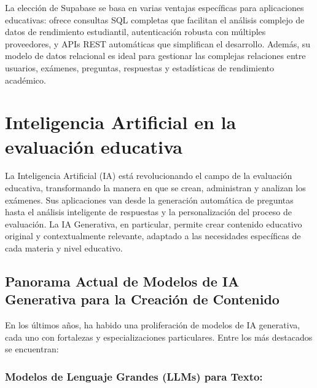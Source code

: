 \documentclass[12pt,a4paper]{report}
\begin{document}
La elección de Supabase se basa en varias ventajas específicas para aplicaciones educativas: ofrece consultas SQL completas que facilitan el análisis complejo de datos de rendimiento estudiantil, autenticación robusta con múltiples proveedores, y APIs REST automáticas que simplifican el desarrollo. Además, su modelo de datos relacional es ideal para gestionar las complejas relaciones entre usuarios, exámenes, preguntas, respuestas y estadísticas de rendimiento académico.

\section{Inteligencia Artificial en la evaluación educativa}

La Inteligencia Artificial (IA) está revolucionando el campo de la evaluación educativa, transformando la manera en que se crean, administran y analizan los exámenes. Sus aplicaciones van desde la generación automática de preguntas hasta el análisis inteligente de respuestas y la personalización del proceso de evaluación. La IA Generativa, en particular, permite crear contenido educativo original y contextualmente relevante, adaptado a las necesidades específicas de cada materia y nivel educativo.

\subsection{Panorama Actual de Modelos de IA Generativa para la Creación de Contenido}

En los últimos años, ha habido una proliferación de modelos de IA generativa, cada uno con fortalezas y especializaciones particulares. Entre los más destacados se encuentran:

\subsubsection{Modelos de Lenguaje Grandes (LLMs) para Texto:}
\end{document}

